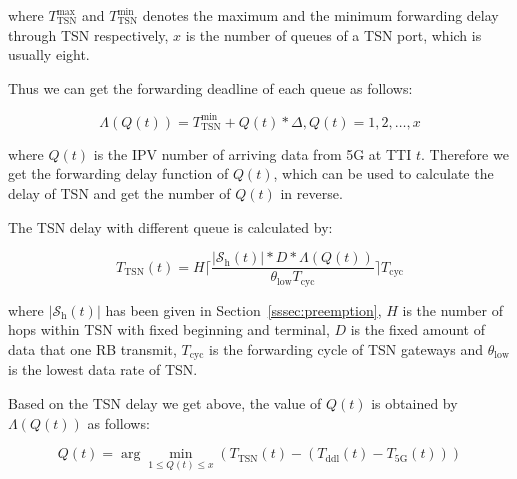 \documentclass{SCIS2021}
\begin{document}
	\vspace{-6pt}
	\noindent where $T_{\text{TSN}}^{\text{max}}$ and $T_{\text{TSN}}^{\text{min}}$ denotes the maximum and the minimum forwarding delay through TSN respectively, $x$ is the number of queues of a TSN port, which is usually eight.
	
	\par Thus we can get the forwarding deadline of each queue as follows:
	
	\setlength\abovedisplayskip{-16pt}
	\begin{center}
		\begin{equation}
			\Lambda\left(Q(t)\right)=T_{\text{TSN}}^{\text{min}}+Q(t) * \Delta,  Q(t)=1,2, \ldots, x
		\end{equation}
	\end{center}
	\setlength\belowdisplayskip{-8pt}
	
	\vspace{-6pt}
	\noindent where $Q(t)$ is the IPV number of arriving data from 5G at TTI $t$. Therefore we get the forwarding delay function of $Q(t)$, which can be used to calculate the delay of TSN and get the number of $Q(t)$ in reverse.
	
	\par  The TSN delay with different queue is calculated by:
	
	\setlength\abovedisplayskip{-16pt}
	\begin{center}
		\begin{equation}
			T_\text{TSN}(t)=H\bigg\lceil\frac{\left|\mathcal{S}_{\mathrm{h}}(t)\right| * D * \Lambda\left(Q(t)\right)}{\theta_\text{low} T_{\text{cyc}}}\bigg\rceil T_{\mathrm{cyc}}
		\end{equation}
	\end{center}
	\setlength\belowdisplayskip{-8pt}
	
	\vspace{-6pt}
	\noindent where $\left|\mathcal{S}_{\mathrm{h}}(t)\right|$ has been given in Section~\ref{sssec:preemption}, $H$ is the number of hops within TSN with fixed beginning and terminal, $D$ is the fixed amount of data that one RB transmit, $T_{\mathrm{cyc}}$ is the forwarding cycle of TSN gateways and $\theta_\text{low}$ is the lowest data rate of TSN.
	
	\par Based on the TSN delay we get above, the value of $Q(t)$ is obtained by $\Lambda\left(Q(t)\right)$ as follows:
	
	\setlength\abovedisplayskip{-16pt}
	\begin{center}
		\begin{equation}
			Q(t)=\arg \min _{1 \leq Q(t) \leq x}\left(T_\text{TSN}(t)-\left(T_\text{ddl}(t)-T_\text{5G}(t)\right)\right)
		\end{equation}
	\end{center}
	\setlength\belowdisplayskip{-8pt}
	
\end{document}
